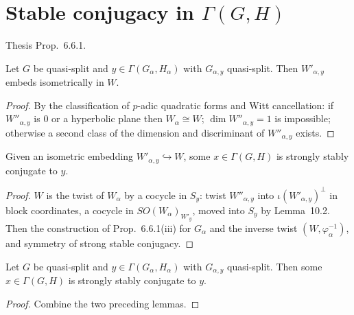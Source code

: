 \section{\texorpdfstring{Stable conjugacy in $\Gamma(G,H)$}{Stable conjugacy in Gamma(G,H)}}
Thesis Prop.~6.6.1.

\begin{lemma}
\label{exists_isometry_fixedSub_of_qd}
\leanok
{}
Let $G$ be quasi-split and $y\in\Gamma(G_\alpha,H_\alpha)$ with $G_{\alpha,y}$ quasi-split. Then $W'_{\alpha,y}$
embeds isometrically in $W$.
\end{lemma}
\begin{proof}
\leanok
{}
By the classification of $p$-adic quadratic forms and Witt cancellation: if $W''_{\alpha,y}$ is $0$ or a
hyperbolic plane then $W_\alpha\cong W$; $\dim W''_{\alpha,y}=1$ is impossible; otherwise a second class of the
dimension and discriminant of $W''_{\alpha,y}$ exists.
\end{proof}

\begin{lemma}
\label{exists_stronglyStablyConj_of_isometry}
\leanok
{}
Given an isometric embedding $W'_{\alpha,y}\hookrightarrow W$, some $x\in\Gamma(G,H)$ is strongly stably
conjugate to $y$.
\end{lemma}
\begin{proof}
\leanok
{}
$W$ is the twist of $W_\alpha$ by a cocycle in $S_y$: twist $W''_{\alpha,y}$ into $\iota(W'_{\alpha,y})^\perp$ in block
coordinates, a cocycle in $SO(W_\alpha)_{W'_y}$, moved into $S_y$ by \cite{Kot86} Lemma~10.2. Then the construction of
Prop.~6.6.1(iii) for $G_\alpha$ and the inverse twist $(W,\varphi_\alpha^{-1})$, and symmetry of strong stable conjugacy.
\end{proof}

\begin{proposition}
\label{prop_12_5_1_i}
\leanok
{}
Let $G$ be quasi-split and $y\in\Gamma(G_\alpha,H_\alpha)$ with $G_{\alpha,y}$ quasi-split. Then some
$x\in\Gamma(G,H)$ is strongly stably conjugate to $y$.
\end{proposition}
\begin{proof}
\leanok
{}
Combine the two preceding lemmas.
\end{proof}

